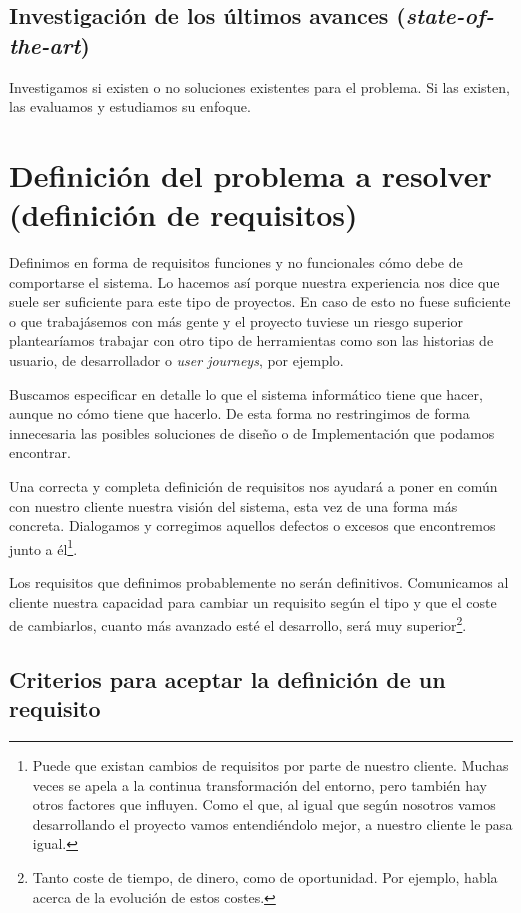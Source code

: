 \subsection{Investigación de los últimos avances (\textit{state-of-the-art})}

Investigamos si existen o no soluciones existentes para el problema. Si las existen,
las evaluamos y estudiamos su enfoque.

\section{Definición del problema a resolver (definición de requisitos)}

Definimos en forma de requisitos funciones y no funcionales cómo debe de comportarse el
sistema. Lo hacemos así porque nuestra experiencia nos dice que suele ser suficiente
para este tipo de proyectos. En caso de esto no fuese suficiente o
que trabajásemos con más gente y el proyecto tuviese un riesgo superior plantearíamos
trabajar con otro tipo de herramientas como son las historias de usuario, de desarrollador
o \textit{user journeys}, por ejemplo.

Buscamos especificar en detalle lo que el sistema informático tiene que hacer, aunque no
cómo tiene que hacerlo. De esta forma no restringimos de forma innecesaria
las posibles soluciones de diseño o de Implementación que podamos encontrar.

Una correcta y completa definición de requisitos nos ayudará a poner en común con nuestro
cliente nuestra visión del sistema, esta vez de una forma más concreta. Dialogamos y corregimos
aquellos defectos o excesos que encontremos junto a él\footnote{%
    Puede que existan cambios de requisitos por parte de nuestro cliente. Muchas veces se
    apela a la continua transformación del entorno, pero también hay otros factores que influyen.
    Como el que, al igual que según nosotros vamos desarrollando el proyecto vamos entendiéndolo
    mejor, a nuestro cliente le pasa igual.
}.

Los requisitos que definimos probablemente no serán definitivos. Comunicamos al cliente nuestra
capacidad para cambiar un requisito según el tipo y que el coste de cambiarlos, cuanto más
avanzado esté el desarrollo, será muy superior\footnote{%
Tanto coste de tiempo, de dinero, como de oportunidad. Por ejemplo, \cite{CodeComplete2} habla
acerca de la evolución de estos costes.%
}.

\subsection{Criterios para aceptar la definición de un requisito}


